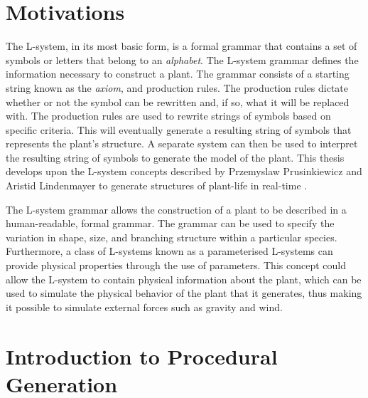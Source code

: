 \section{Motivations}

The L-system, in its most basic form, is a formal grammar that contains a set of symbols or letters that belong to an \textit{alphabet}. The L-system grammar defines the information necessary to construct a plant. The grammar consists of a starting string known as the \textit{axiom}, and production rules. The production rules dictate whether or not the symbol can be rewritten and, if so, what it will be replaced with. The production rules are used to rewrite strings of symbols based on specific criteria. This will eventually generate a resulting string of symbols that represents the plant's structure. A separate system can then be used to interpret the resulting string of symbols to generate the model of the plant. This thesis develops upon the L-system concepts described by Przemyslaw Prusinkiewicz and Aristid Lindenmayer to generate structures of plant-life in real-time \cite{Prusinkiewicz1989}. 

The L-system grammar allows the construction of a plant to be described in a human-readable, formal grammar. The grammar can be used to specify the variation in shape, size, and branching structure within a particular species. Furthermore, a class of L-systems known as a parameterised L-systems can provide physical properties through the use of parameters. This concept could allow the L-system to contain physical information about the plant, which can be used to simulate the physical behavior of the plant that it generates, thus making it possible to simulate external forces such as gravity and wind.

\section{Introduction to Procedural Generation}

